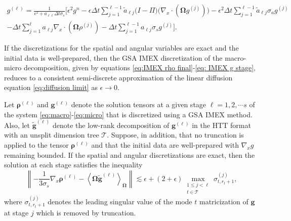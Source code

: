 \documentclass[10pt,a4paper]{amsart}
\begin{document}
\begin{multline}
    \label{eq:IMEX g stage explicit}
    g^{(\ell)} = \frac{1}{\epsilon^{2} + a_{\ell \ell} \Delta t \sigma_{s}} \Bigg[ \epsilon^{2} g^{n} - \epsilon \Delta t \sum_{j=1}^{\ell-1} \widetilde{a}_{\ell j} \Big( I - \Pi \Big) \Big( \nabla_{x} \cdot \left(  \mathbf{\Omega} g^{(j)} \right) \Big) - \epsilon^{2} \Delta t \sum_{j=1}^{\ell-1} \widetilde{a}_{\ell j} \sigma_{a} g^{(j)} \\  - \Delta t \sum_{j=1}^{\ell} a_{\ell j} \nabla_{x} \cdot \left( \mathbf{\Omega} \rho^{(j)} \right) -  \Delta t \sum_{j=1}^{\ell-1} a_{\ell j} \sigma_{s} g^{(j)} \Bigg].
\end{multline}

\begin{theorem}
    \label{thm:MM AP property IMEX}
    If the discretizations for the spatial and angular variables are exact and the initial data is well-prepared, then the GSA IMEX discretization of the macro-micro decomposition, given by equations \eqref{eq:IMEX rho final}-\eqref{eq: IMEX g stage}, reduces to a consistent semi-discrete approximation of the linear diffusion equation \eqref{eq:diffusion limit} as $\epsilon \rightarrow 0$.
\end{theorem}

\begin{lemma}
\label{lem:unsplit asymptotic error bound}
    Let $\boldsymbol{\rho}^{(\ell)}$ and $\mathbf{g}^{(\ell)}$ denote the solution tensors at a given stage $\ell = 1,2, \cdots s$ of the system \eqref{eq:macro}-\eqref{eq:micro} that is discretized using a GSA IMEX method. Also, let $\widetilde{\mathbf{g}}^{(\ell)}$ denote the low-rank decomposition of $\mathbf{g}^{(\ell)}$ in the HTT format with an unsplit dimension tree $\mathcal{T}$. Suppose, in addition, that no truncation is applied to the tensor $\boldsymbol{\rho}^{(\ell)}$ and that the initial data are well-prepared with $\nabla_{x}g$ remaining bounded. If the spatial and angular discretizations are exact, then the solution at each stage satisfies the inequality
    $$
        \left\lVert -\frac{1}{3\sigma_s} \nabla_x \boldsymbol{\rho}^{(\ell)} - \left\langle \mathbf{\Omega} \widetilde{\mathbf{g}}^{(\ell)} \right\rangle_{\mathbf{\Omega}} \right\rVert \lesssim \epsilon + (2 + \epsilon)\max_{\substack{1 \leq j < \ell \\ t \in \mathcal{T}}} \sigma_{t,r_{t}+1}^{(j)},
    $$
    where $\sigma_{t,r_{t}+1}^{(j)}$ denotes the leading singular value of the mode $t$ matricization of $\mathbf{g}$ at stage $j$ which is removed by truncation.
\end{lemma}
\end{document}
